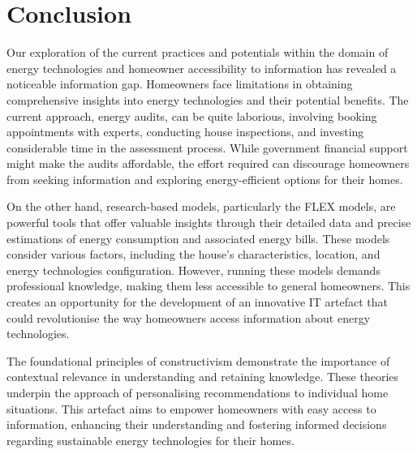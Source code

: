 \section{Conclusion}

Our exploration of the current practices and potentials within the domain of energy technologies and homeowner accessibility to information has revealed a noticeable information gap. 
Homeowners face limitations in obtaining comprehensive insights into energy technologies and their potential benefits.
The current approach, energy audits, can be quite laborious, 
involving booking appointments with experts, conducting house inspections, and investing considerable time in the assessment process. 
While government financial support might make the audits affordable, 
the effort required can discourage homeowners from seeking information and exploring energy-efficient options for their homes.

On the other hand, research-based models, particularly the FLEX models, 
are powerful tools that offer valuable insights through their detailed data and precise estimations of energy consumption and associated energy bills. 
These models consider various factors, including the house's characteristics, location, and energy technologies configuration. 
However, running these models demands professional knowledge, making them less accessible to general homeowners.
This creates an opportunity for the development of an innovative IT artefact that could revolutionise the way homeowners access information about energy technologies. 

The foundational principles of constructivism demonstrate the importance of contextual relevance in understanding and retaining knowledge.
These theories underpin the approach of personalising recommendations to individual home situations.
This artefact aims to empower homeowners with easy access to information, enhancing their understanding and fostering informed decisions regarding sustainable energy technologies for their homes.